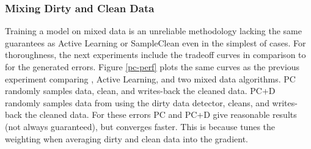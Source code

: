 \subsubsection{Mixing Dirty and Clean Data}
Training a model on mixed data is an unreliable methodology lacking the same guarantees as Active Learning or SampleClean even in the simplest of cases.
For thoroughness, the next experiments include the tradeoff curves in comparison to \sys for the generated errors.
Figure \ref{pc-perf} plots the same curves as the previous experiment comparing \sys, Active Learning, and two mixed data algorithms.
PC randomly samples data, clean, and writes-back the cleaned data.
PC+D randomly samples data from using the dirty data detector, cleans, and writes-back the cleaned data.
For these errors PC and PC+D give reasonable results (not always guaranteed), but \sys converges faster.
This is because \sys tunes the weighting when averaging dirty and clean data into the gradient.

